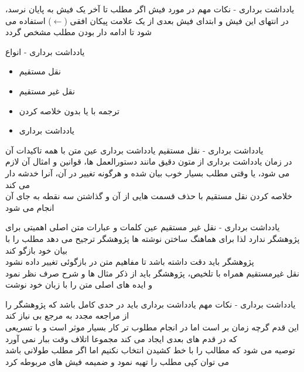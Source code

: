 \documentclass[14pt]{beamer}
\makeatletter
\newcommand{\rtlist}{\raggedleft\rightskip\@totalleftmargin}
\newcommand{\framefontsizelarge}{\fontsize{18pt}{0pt}\selectfont}
\newcommand{\frametitlefontsize}{\fontsize{20pt}{0pt}\selectfont}
\newcommand{\defaultvspace}{\vspace{5mm}}
\makeatother
\begin{document}
\begin{persian}
\begin{frame}{\frametitlefontsize یادداشت برداری - نکات مهم در مورد فیش}
	   اگر مطلب تا آخر یک فیش به پایان نرسد، در انتهای این فیش و ابتدای فیش بعدی از یک علامت پیکان افقی 
	   ($\leftarrow$)
	   استفاده می شود تا ادامه دار بودن مطلب مشخص گردد	
	\end{frame}
	
	\begin{frame}{\frametitlefontsize یادداشت برداری - انواع}
		\framefontsizelarge
		\begin{itemize}\rtlist
			\item نقل مستقیم
			\item نقل غیر مستقیم
			\item ترجمه با یا بدون خلاصه کردن
			\item یادداشت برداری
		\end{itemize}
	\end{frame}
	
	\begin{frame}{\frametitlefontsize یادداشت برداری - نقل مستقیم}
		\framefontsizelarge
		یادداشت برداری عین متن با همه تاکیدات آن\defaultvspace\\
		در زمان یادداشت برداری از متون دقیق مانند دستورالعمل ها، قوانین و امثال آن لازم می شود، یا وقتی مطلب بسیار خوب بیان شده و هرگونه تغییر در آن، آنرا خدشه دار می کند\defaultvspace\\
		خلاصه کردن نقل مستقیم با حذف قسمت هایی از آن و گذاشتن سه نقطه به جای آن انجام می شود
	\end{frame}
	
	\begin{frame}{\frametitlefontsize یادداشت برداری - نقل غیر مستقیم}
		\framefontsizelarge
	   عین کلمات و عبارات متن اصلی اهمیتی برای پژوهشگر ندارد لذا برای هماهنگ ساختن نوشته ها پژوهشگر ترجیح می دهد مطلب را با بیان خود بازگو کند\defaultvspace\\
		پژوهشگر باید دقت داشته باشد تا مفاهیم متن در بازگوئی تغییر داده نشود\defaultvspace\\
		نقل غیرمستقیم همراه با تلخیص، پژوهشگر باید از ذکر مثال ها و شرح صرف نظر نمود و ایده های اصلی متن را با زبان خود نوشت
	\end{frame}
	
	\begin{frame}{\frametitlefontsize یادداشت برداری - نکات مهم}
		\framefontsizelarge
		یادداشت برداری باید در حدی کامل باشد که پژوهشگر را از مراجعه مجدد به مرجع بی نیاز کند\\
		این قدم گرچه زمان بر است اما در انجام مطلوب تر کار بسیار موثر است و با تسریعی که در قدم های بعدی ایجاد می کند مجموعا اتلاف وقت ببار نمی آورد\defaultvspace\\
		توصیه می شود که مطالب را با خط کشیدن انتخاب نکنیم اما اگر مطلب طولانی باشد می توان کپی مطلب را تهیه نمود و ضمیمه فیش های مربوطه کرد
	\end{frame}
	

\end{persian}
\end{document}
